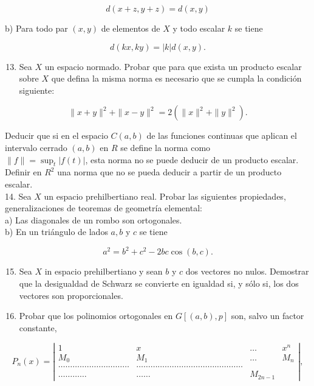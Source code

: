 \documentclass[10pt]{article}
\theoremstyle{plain}
\theoremstyle{definition}
\theoremstyle{remark}
\begin{document}
$$
d(x+z, y+z)=d(x, y)
$$

b) Para todo par $(x, y)$ de elementos de $X$ y todo escalar $k$ se tiene

$$
d(k x, k y)=|k| d(x, y) .
$$

\begin{enumerate}
  \setcounter{enumi}{12}
  \item Sea $X$ un espacio normado. Probar que para que exista un producto escalar sobre $X$ que defina la misma norma es necesario que se cumpla la condición siguiente:
\end{enumerate}

$$
\|x+y\|^{2}+\|x-y\|^{2}=2\left(\|x\|^{2}+\|y\|^{2}\right) .
$$

Deducir que si en el espacio $C(a, b)$ de las funciones continuas que aplican el intervalo cerrado $(a, b)$ en $R$ se define la norma como\\
$\|f\|=\sup _{t}|f(t)|$, esta norma no se puede deducir de un producto escalar.\\
Definir en $R^{2}$ una norma que no se pueda deducir a partir de un producto escalar.\\
14. Sea $X$ un espacio prehilbertiano real. Probar las siguientes propiedades, generalizaciones de teoremas de geometría elemental:\\
a) Las diagonales de un rombo son ortogonales.\\
b) En un triángulo de lados $a, b$ y $c$ se tiene

$$
a^{2}=b^{2}+c^{2}-2 b c \cos (b, c) .
$$

\begin{enumerate}
  \setcounter{enumi}{14}
  \item Sea $X$ in espacio prehilbertiano y sean $b$ y $c$ dos vectores no nulos. Demostrar que la desigualdad de Schwarz se convierte en igualdad si, y sólo si, los dos vectores son proporcionales.
  \item Probar que los polinomios ortogonales en $G[(a, b), p]$ son, salvo un factor constante,
\end{enumerate}

$$
P_{n}(x)=\left|\begin{array}{cccc}
1 & x & \ldots & x^{n} \\
M_{0} & M_{1} & \ldots & M_{n} \\
\ldots \ldots \ldots \ldots \ldots \ldots \ldots \ldots \ldots \ldots & \ldots \ldots \ldots \ldots \ldots \ldots \ldots \ldots \ldots \ldots \ldots \ldots \ldots \ldots \ldots \\
\ldots \ldots \ldots \ldots & \ldots \ldots & M_{2 n-1}
\end{array}\right|,
$$
\end{document}
